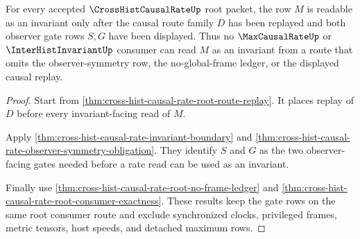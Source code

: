 \begin{theorem}
\label{thm:cross-hist-causal-rate-max-observer-gate}
For every accepted $\CrossHistCausalRateUp$ root packet, the row $M$ is readable as an invariant only after the causal route family $D$ has been replayed and both observer gate rows $S,G$ have been displayed. Thus no $\MaxCausalRateUp$ or $\InterHistInvariantUp$ consumer can read $M$ as an invariant from a route that omits the observer-symmetry row, the no-global-frame ledger, or the displayed causal replay.
\end{theorem}
\begin{proof}
Start from \autoref{thm:cross-hist-causal-rate-root-route-replay}. It places replay of $D$ before every invariant-facing read of $M$.

Apply \autoref{thm:cross-hist-causal-rate-invariant-boundary} and \autoref{thm:cross-hist-causal-rate-observer-symmetry-obligation}. They identify $S$ and $G$ as the two observer-facing gates needed before a rate read can be used as an invariant.

Finally use \autoref{thm:cross-hist-causal-rate-root-no-frame-ledger} and \autoref{thm:cross-hist-causal-rate-root-consumer-exactness}. These results keep the gate rows on the same root consumer route and exclude synchronized clocks, privileged frames, metric tensors, host speeds, and detached maximum rows.
\end{proof}

